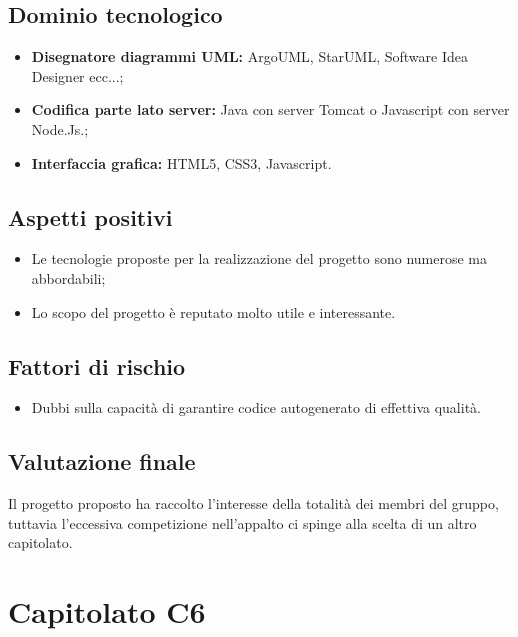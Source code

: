 \documentclass[openany,12pt,a4paper]{report}
\begin{document}
\subsection{Dominio tecnologico}

\begin{itemize}
    \item \textbf{Disegnatore diagrammi UML:} ArgoUML, StarUML, Software Idea Designer ecc...;
    
    \item \textbf{Codifica parte lato server:} Java con server Tomcat o Javascript con server Node.Js.;
    
    \item \textbf{Interfaccia grafica:} HTML5, CSS3, Javascript.
\end{itemize}

\subsection{Aspetti positivi}

\begin{itemize}
    \item Le tecnologie proposte per la realizzazione del progetto sono numerose ma abbordabili;
    
    \item Lo scopo del progetto è reputato molto utile e interessante.
\end{itemize}

\subsection{Fattori di rischio}

\begin{itemize}
    \item Dubbi sulla capacità di garantire codice autogenerato di effettiva qualità.
\end{itemize}

\subsection{Valutazione finale}

Il progetto proposto ha raccolto l'interesse della totalità dei membri del gruppo, tuttavia l'eccessiva competizione nell'appalto ci spinge alla scelta di un altro capitolato.


\section{Capitolato C6}
\end{document}

